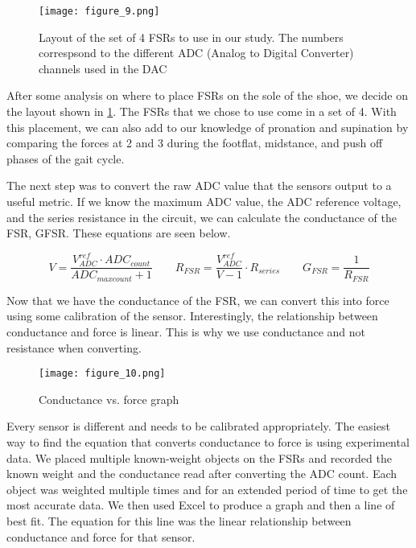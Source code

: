 \begin{figure}[h]
  \centering
  \texttt{[image: figure\_9.png]}
  \caption[FSR layout]{Layout of the set of 4 FSRs to use in our study. The numbers correspsond to the different ADC (Analog to Digital Converter) channels used in the DAC}
  \label{fig:x fsr layout}
\end{figure}

After some analysis on where to place FSRs on the sole of the shoe, we decide on the layout shown in \ref{fig:x fsr layout}.
The FSRs that we chose to use come in a set of 4.
With this placement, we can also add to our knowledge of pronation and supination by comparing the forces at 2 and 3 during the footflat, midstance, and push off phases of the gait cycle.\par

The next step was to convert the raw ADC value that the sensors output to a useful metric.
If we know the maximum ADC value, the ADC reference voltage, and the series resistance in the circuit, we can calculate the conductance of the FSR, GFSR.
These equations are seen below.

$$V=\frac{V^{ref}_{ADC}\cdot ADC_{count}}{ADC_{max count}+1}\qquad R_{FSR}=\frac{V^{ref}_{ADC}}{V-1}\cdot R_{series}\qquad G_{FSR}=\frac{1}{R_{FSR}}$$

Now that we have the conductance of the FSR, we can convert this into force using some calibration of the sensor.
Interestingly, the relationship between conductance and force is linear.
This is why we use conductance and not resistance when converting.\par

\begin{figure}[h]
  \centering
  \texttt{[image: figure\_10.png]}
  \caption[Conductance vs. force]{Conductance vs. force graph \parencite{tekscan-convert}}
  \label{fig:x cond. vs force}
\end{figure}

Every sensor is different and needs to be calibrated appropriately.
The easiest way to find the equation that converts conductance to force is using experimental data.
We placed multiple known-weight objects on the FSRs and recorded the known weight and the conductance read after converting the ADC count.
Each object was weighted multiple times and for an extended period of time to get the most accurate data.
We then used Excel to produce a graph and then a line of best fit.
The equation for this line was the linear relationship between conductance and force for that sensor.\par

